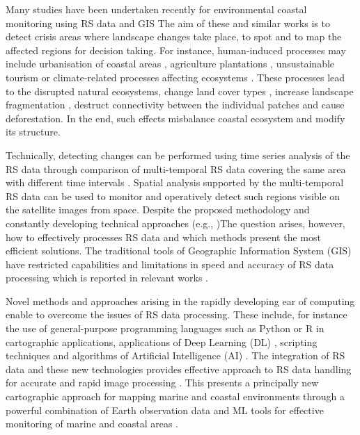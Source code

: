\documentclass[jmse,article,submit,pdftex,moreauthors]{Definitions/mdpi}
\begin{document}
Many studies have been undertaken recently for environmental coastal monitoring using RS data and GIS \cite{BISHOPTAYLOR2021112734} The aim of these and similar works is to detect crisis areas where landscape changes take place, to spot and to map the affected regions for decision taking. For instance, human-induced processes may include urbanisation of coastal areas \cite{ANTOS2007173}, agriculture plantations \cite{6723525}, unsustainable tourism \cite{WESTON200998,Howesetal} or climate-related processes affecting ecosystems \cite{Glenn,Lemenkova202221}. These processes lead to the disrupted natural ecosystems, change land cover types \cite{DPCOSTA2024101574}, increase landscape fragmentation \cite{Lemenkova202406}, destruct connectivity between the individual patches and cause deforestation. In the end, such effects misbalance coastal ecosystem and modify its structure.  

Technically, detecting changes can be performed using time series analysis of the RS data through comparison of multi-temporal RS data covering the same area with different time intervals \cite{GAO2024119622,Vasquez2023,MASRIA2024103502}. Spatial analysis supported by the multi-temporal RS data can be used to monitor and operatively detect such regions visible on the satellite images from space. Despite the proposed methodology and constantly developing technical approaches (e.g., \cite{BUGNOT2018939})The question arises, however, how to effectively processes RS data and which methods present the most efficient solutions. The traditional tools of Geographic Information System (GIS) have restricted capabilities and limitations in speed and accuracy of RS data processing which is reported in relevant works \cite{BLACKFORD1995247,Whig2024,Rolim2023}. 

Novel methods and approaches arising in the rapidly developing ear of computing enable to overcome the issues of RS data processing. These include, for instance the use of general-purpose programming languages such as Python or R in cartographic applications, applications of Deep Learning (DL) \cite{Park,Roselin}, scripting techniques \cite{Lemenkova202212,Lemenkova202213} and algorithms of Artificial Intelligence (AI) \cite{rs11060617}. The integration of RS data and these new technologies provides effective approach to  RS data handling for accurate and rapid image processing \cite{Turnbull,Lemenkova202323}. This presents a principally new cartographic approach for mapping marine and coastal environments through a powerful combination of Earth observation data and ML tools for effective monitoring of marine and coastal areas \cite{Cao2022}.
\end{document}
